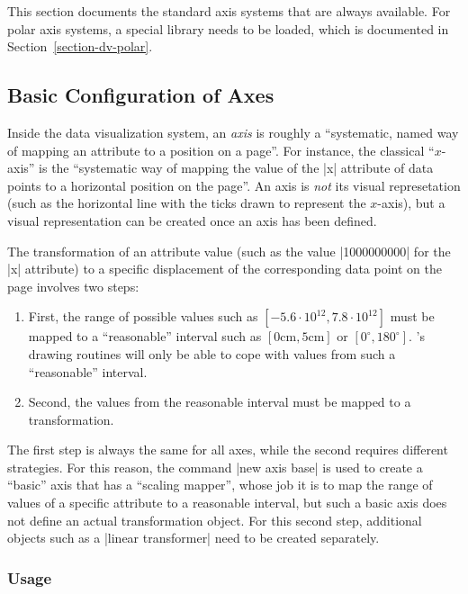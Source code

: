 This section documents the standard axis systems that are always
available. For polar axis systems, a special library needs to be
loaded, which is documented in Section~\ref{section-dv-polar}.



\subsection{Basic Configuration of Axes}
\label{section-dv-axes-main}

Inside the data visualization system, an \emph{axis} is roughly a
``systematic, named way of mapping an attribute to a 
position on a page''. For instance, the classical ``$x$-axis'' is the
``systematic way of mapping the value of the |x| attribute of data
points to a horizontal position on the page''. An axis is \emph{not}
its visual represetation (such as the horizontal line with the ticks
drawn to represent the $x$-axis), but a visual representation can be
created once an axis has been defined.

The transformation of an attribute value (such as the value |1000000000|
for the |x| attribute) to a specific displacement of the corresponding
data point on the page involves two steps:
\begin{enumerate}
\item First, the range of possible values such as $[-5.6\cdot
  10^{12},7.8\cdot 10^{12}]$ must be mapped to a ``reasonable''
  interval such as $[0\mathrm{cm},5\mathrm{cm}]$ or
  $[0^\circ,180^\circ]$. \tikzname's drawing routines will only be
  able to cope with values from such a ``reasonable'' interval.
\item Second, the values from the reasonable interval must be mapped
  to a transformation.
\end{enumerate}
The first step is always the same for all axes, while the second
requires different strategies. For this reason, the command
|new axis base| is used to create a ``basic'' axis that has a
``scaling mapper'', whose job it is to map the range of values of a
specific attribute to a reasonable interval, but such a basic axis
does not define an actual transformation object. For this second step,
additional objects such as a |linear transformer| need to be created
separately. 


\subsubsection{Usage}

